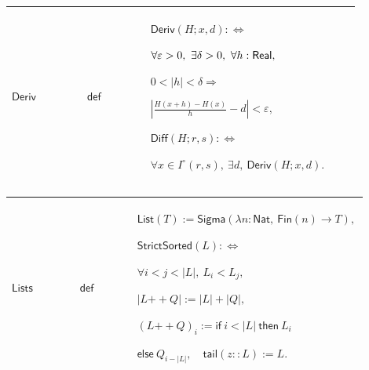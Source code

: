 \documentclass[12pt,reqno]{amsart}
\theoremstyle{blueplain}
\numberwithin{equation}{section}
\begin{document}
{\scriptsize \setlength{\parskip}{0pt}\nointerlineskip
\noindent 
\begin{tabular}{|@{}>{\centering\arraybackslash}m{0.19251\linewidth}|>{\centering\arraybackslash}m{0.16845\linewidth}|>{\centering\arraybackslash}m{0.53904\linewidth}|}
\hline
\hypertarget{def:Deriv}{$\displaystyle \mathsf{Deriv}$} & $\displaystyle 
\mathsf{def}$ & $\displaystyle \mathsf{Deriv}(H;x,d):\Longleftrightarrow$\par%
$\displaystyle \forall\varepsilon>0,\ \exists\delta>0,\ \forall h:\mathsf{%
Real},$\par$\displaystyle 0<|h|<\delta\Rightarrow$\par$\displaystyle \left|%
\frac{H(x+h)-H(x)}h-d\right|<\varepsilon,$\par$\displaystyle \mathsf{Diff}%
(H;r,s):\Longleftrightarrow$\par$\displaystyle \forall x\in I^\circ(r,s),\
\exists d,\ \mathsf{Deriv}(H;x,d).$ \\ \hline
\end{tabular}%
}

{\scriptsize \setlength{\parskip}{0pt}\nointerlineskip
\noindent 
\begin{tabular}{|@{}>{\centering\arraybackslash}m{0.19251\linewidth}|>{\centering\arraybackslash}m{0.16845\linewidth}|>{\centering\arraybackslash}m{0.53904\linewidth}|}
\hline
\hypertarget{def:Lists}{$\displaystyle \mathsf{Lists}$} & $\displaystyle 
\mathsf{def}$ & $\displaystyle \mathsf{List}(T):=\mathsf{Sigma}(\lambda n:%
\mathsf{Nat},\ \mathsf{Fin}(n)\to T),$\par$\displaystyle \mathsf{StrictSorted%
}(L):\Longleftrightarrow$\par$\displaystyle \forall i<j<|L|,\ L_i<L_j,$\par$%
\displaystyle |L\mathbin{+\!\!+}Q|:=|L|+|Q|,$\par$\displaystyle (L%
\mathbin{+\!\!+}Q)_i:=\mathsf{if}\ i<|L|\ \mathsf{then}\ L_i$\par$%
\displaystyle \mathsf{else}\ Q_{i-|L|},\quad\mathsf{tail}(z::L):=L.$ \\ 
\hline
\end{tabular}%
}
\end{document}

